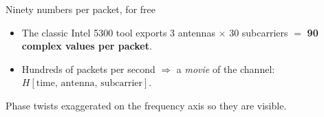 \begin{frame}{Ninety numbers per packet, for free}
  \vspace{0.3em}
  \centering

  \vspace{0.5em}
  \raggedright
  {\small
   \begin{itemize}\itemsep3pt
     \item The classic Intel 5300 tool exports $3$ antennas $\times$ $30$
       subcarriers $=$ \textbf{90 complex values per packet}.
     \item Hundreds of packets per second $\Rightarrow$ a \emph{movie} of the
       channel: $H[\text{time},\, \text{antenna},\, \text{subcarrier}]$.
   \end{itemize}\par}

  {\scriptsize\color{softgray}Phase twists exaggerated on the frequency axis so
   they are visible.\par}

\end{frame}

